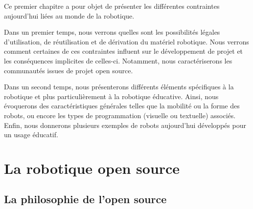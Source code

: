 \begin{resumChap}
Ce premier chapitre a pour objet de présenter les différentes contraintes aujourd'hui liées au monde de la robotique.\par%
Dans un premier temps, nous verrons quelles sont les possibilités légales d'utilisation, de réutilisation et de dérivation du matériel robotique.
Nous verrons comment certaines de ces contraintes influent sur le développement de projet et les conséquences implicites de celles-ci. Notamment, nous caractériserons les communautés issues de projet open source.\par%
Dans un second temps, nous présenterons différents éléments spécifiques à la robotique et plus particulièrement à la robotique éducative. Ainsi, nous évoquerons des caractéristiques générales telles que la mobilité ou la forme des robots, ou encore les types de programmation (visuelle ou textuelle) associés. Enfin, nous donnerons plusieurs exemples de robots aujourd'hui développés pour un usage éducatif.
\end{resumChap}
\section{La robotique open source}
    \subsection{La philosophie de l'open source}\label{sec:open}
